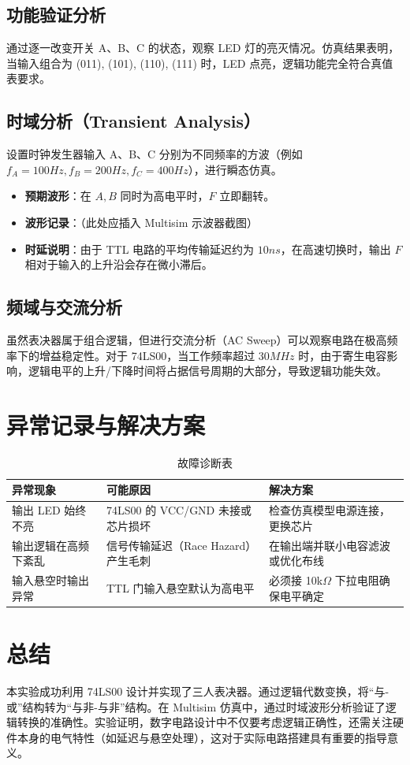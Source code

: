 \documentclass[12pt,a4paper]{article}
\begin{document}
\subsection{功能验证分析}
通过逐一改变开关 A、B、C 的状态，观察 LED 灯的亮灭情况。仿真结果表明，当输入组合为 (011), (101), (110), (111) 时，LED 点亮，逻辑功能完全符合真值表要求。

\subsection{时域分析（Transient Analysis）}
设置时钟发生器输入 A、B、C 分别为不同频率的方波（例如 $f_A=100Hz, f_B=200Hz, f_C=400Hz$），进行瞬态仿真。
\begin{itemize}
    \item \textbf{预期波形}：在 $A, B$ 同时为高电平时，$F$ 立即翻转。
    \item \textbf{波形记录}：（此处应插入 Multisim 示波器截图）
    \item \textbf{时延说明}：由于 TTL 电路的平均传输延迟约为 $10ns$，在高速切换时，输出 $F$ 相对于输入的上升沿会存在微小滞后。
\end{itemize}

\subsection{频域与交流分析}
虽然表决器属于组合逻辑，但进行交流分析（AC Sweep）可以观察电路在极高频率下的增益稳定性。对于 74LS00，当工作频率超过 $30MHz$ 时，由于寄生电容影响，逻辑电平的上升/下降时间将占据信号周期的大部分，导致逻辑功能失效。

\section{异常记录与解决方案}

\begin{table}[H]
\centering
\caption{故障诊断表}
\begin{tabular}{p{4cm}|p{5cm}|p{5cm}}
\toprule
\textbf{异常现象} & \textbf{可能原因} & \textbf{解决方案} \\
\midrule
输出 LED 始终不亮 & 74LS00 的 VCC/GND 未接或芯片损坏 & 检查仿真模型电源连接，更换芯片 \\
\hline
输出逻辑在高频下紊乱 & 信号传输延迟（Race Hazard）产生毛刺 & 在输出端并联小电容滤波或优化布线 \\
\hline
输入悬空时输出异常 & TTL 门输入悬空默认为高电平 & 必须接 10k$\Omega$ 下拉电阻确保电平确定 \\
\bottomrule
\end{tabular}
\end{table}

\section{总结}
本实验成功利用 74LS00 设计并实现了三人表决器。通过逻辑代数变换，将“与-或”结构转为“与非-与非”结构。在 Multisim 仿真中，通过时域波形分析验证了逻辑转换的准确性。实验证明，数字电路设计中不仅要考虑逻辑正确性，还需关注硬件本身的电气特性（如延迟与悬空处理），这对于实际电路搭建具有重要的指导意义。
\end{document}
